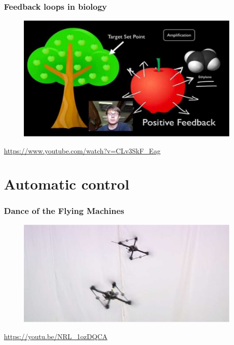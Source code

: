 \documentclass{beamer}
\begin{document}

\begin{frame}
\frametitle{Feedback loops in biology}
\begin{figure}
\includegraphics[width=.9\linewidth]{feedback_biology}
\end{figure}
\url{https://www.youtube.com/watch?v=CLv3SkF_Eag}
\end{frame}

\section{Automatic control} 

\begin{frame}
\frametitle{Dance of the Flying Machines}
\begin{figure}
\includegraphics[scale=.6]{flying_machines}
\end{figure}
\url{https://youtu.be/NRL_1ozDQCA}
\end{frame}

\end{document}

